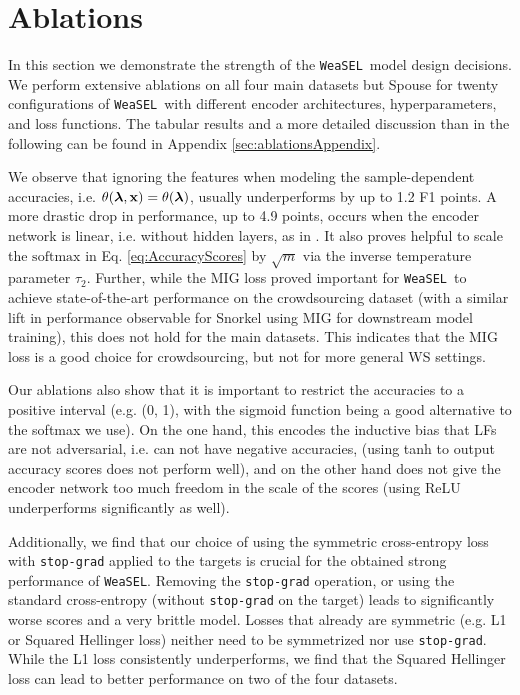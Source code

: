 \documentclass{article}
\newcommand{\softmax}{\mathrm{softmax}}
\newcommand{\weasel}{\texttt{WeaSEL}}\newcommand{\brackets}[1]{\left( #1 \right)}
\newcommand{\features}{\mathbf{x}}
\begin{document}
\section{Ablations}
In this section we demonstrate the strength of the \weasel\ model design decisions. We perform extensive ablations on all four main datasets but Spouse for twenty configurations of \weasel\ with different encoder architectures, hyperparameters, and loss functions.
The tabular results and a more detailed discussion than in the following can be found in Appendix \ref{sec:ablationsAppendix}.

We observe that ignoring the features when modeling the sample-dependent accuracies, i.e. $\theta(\lfs, \features) = \theta(\lfs)$, usually underperforms by up to 1.2 F1 points.
A more drastic drop in performance, up to 4.9 points, occurs when the encoder network is linear, i.e. without hidden layers, as in \cite{MaxMIG}.
It also proves helpful to scale the $\softmax$ in Eq. \ref{eq:AccuracyScores} by $\sqrt{m}$ via the inverse temperature parameter $\tau_2$. Further, while the MIG loss proved important for \weasel\ to achieve state-of-the-art performance on the crowdsourcing dataset (with a similar lift in performance observable for Snorkel using MIG for downstream model training), this does not hold for the main datasets. This indicates that the MIG loss is a good choice for crowdsourcing, but not for more general WS settings.  


Our ablations also show that it is important to restrict the accuracies to a positive interval (e.g. (0, 1), with the sigmoid function being a good alternative to the softmax we use). On the one hand, this encodes the inductive bias that LFs are not adversarial, i.e. can not have negative accuracies, (using tanh to output accuracy scores does not perform well), and on the other hand does not give the encoder network too much freedom in the scale of the scores (using ReLU underperforms significantly as well). 

Additionally, we find that our choice of using the symmetric cross-entropy loss with \texttt{stop-grad} applied to the targets is  crucial for the obtained strong performance of \weasel. Removing the \texttt{stop-grad} operation, or using the standard cross-entropy (without \texttt{stop-grad} on the target) leads to significantly worse scores and a very brittle model.
Losses that already are symmetric (e.g. L1 or Squared Hellinger loss) neither need to be symmetrized nor use \texttt{stop-grad}. While the L1 loss consistently underperforms, we find that the Squared Hellinger loss can lead to better performance on two of the four datasets.
\end{document}

